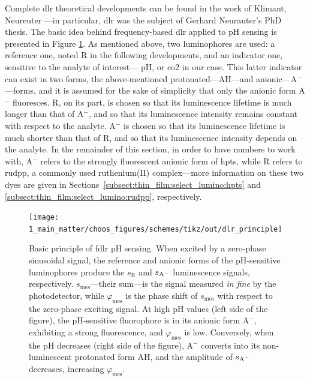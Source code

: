 Complete \gls{dlr} theoretical developments can be found in the work of Klimant, Neureuter \etal{}\cite{neurauter2000_phd, klimant2001_pap}---in particular, \gls{dlr} was the subject of Gerhard Neurauter's PhD thesis. The basic idea behind frequency-based \gls{dlr} applied to pH sensing is presented in Figure \ref{fig:choos:dye_based:dlr_theory:dlr_principle}. As mentioned above, two luminophores are used: a reference one, noted R in the following developments, and an indicator one, sensitive to the analyte of interest---\ie{} pH, or \gls{co2} in our case. This latter indicator can exist in two forms, the above-mentioned protonated---AH---and anionic---A$^-$---forms, and it is assumed for the sake of simplicity that only the anionic form A$^-$ fluoresces. R, on its part, is chosen so that its luminescence lifetime is much longer than that of A$^-$, and so that its luminescence intensity remains constant with respect to the analyte. A$^-$ is chosen so that its luminescence lifetime is much shorter than that of R, and so that its luminescence intensity depends on the analyte. In the remainder of this section, in order to have numbers to work with, A$^-$ refers to the strongly fluorescent anionic form of \gls{hpts}, while R refers to \gls{rudpp}, a commonly used ruthenium(II) complex---more information on these two dyes are given in Sections~\ref{subsect:thin_film:select_lumino:hpts} and \ref{subsect:thin_film:select_lumino:rudpp}, respectively.

\begin{figure} %
	\centering
	\texttt{[image: 1\_main\_matter/choos\_figures/schemes/tikz/out/dlr\_principle]}
	\caption[Basic principle of \gls{fdlr} pH sensing.]{Basic principle of \gls{fdlr} pH sensing. When excited by a zero-phase sinusoidal signal, the reference and anionic forms of the pH-sensitive luminophores produce the  $s_\text{R}$ and $s_\mathrm{A^{\smash{-}}}$ luminescence signals, respectively. $s_\text{mes}$---their sum---is the signal measured \emph{in fine} by the photodetector, while $\varphi_\text{mes}$ is the phase shift of $s_\text{mes}$ with respect to the zero-phase exciting signal. At high pH values (left side of the figure), the pH-sensitive fluorophore is in its anionic form A$^-$, exhibiting a strong fluorescence, and $\varphi_\text{mes}$ is low. Conversely, when the pH decreases (right side of the figure), A$^-$ converts into its non-luminescent protonated form AH, and the amplitude of $s_\mathrm{A^{\smash{-}}}$ decreases, increasing $\varphi_\text{mes}$.}
	\label{fig:choos:dye_based:dlr_theory:dlr_principle}
\end{figure}

